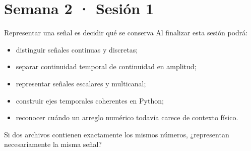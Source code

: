 \documentclass[
  ignorenonframetext,
  aspectratio=169,
  spanish,
  professionalfonts]{beamer}
\providecommand{\tightlist}{%
  \setlength{\itemsep}{0pt}\setlength{\parskip}{0pt}}
\begin{document}
\section{Semana 2 · Sesión 1}\label{semana-2-sesiuxf3n-1}

\begin{frame}{Representar una señal es decidir qué se conserva}
\protect{}\label{representar-una-seuxf1al-es-decidir-quuxe9-se-conserva}
Al finalizar esta sesión podrá:

\begin{itemize}
\tightlist
\item
  distinguir señales continuas y discretas;
\item
  separar continuidad temporal de continuidad en amplitud;
\item
  representar señales escalares y multicanal;
\item
  construir ejes temporales coherentes en Python;
\item
  reconocer cuándo un arreglo numérico todavía carece de contexto
  físico.
\end{itemize}

\begin{tcolorbox}[enhanced jigsaw, arc=.35mm, bottomrule=.15mm, bottomtitle=1mm, breakable, colback=white, colbacktitle=quarto-callout-note-color!10!white, colframe=quarto-callout-note-color-frame, coltitle=black, left=2mm, leftrule=.75mm, opacityback=0, opacitybacktitle=0.6, rightrule=.15mm, title={Pregunta inicial}, titlerule=0mm, toprule=.15mm, toptitle=1mm]

Si dos archivos contienen exactamente los mismos números, ¿representan
necesariamente la misma señal?

\end{tcolorbox}
\end{frame}
\end{document}
